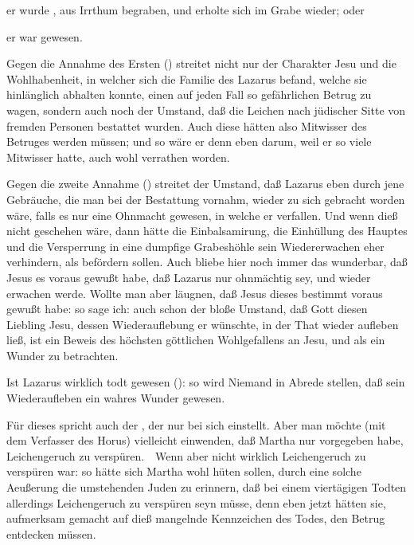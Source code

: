 \begin{aufza}
\begin{aufzb}
\begin{aufzc}
\item er wurde , aus Irrthum begraben, und erholte sich im Grabe wieder; oder
\item er war  gewesen.
\item[Gegen] die Annahme des Ersten () streitet nicht nur der Charakter Jesu und die Wohlhabenheit, in welcher sich die Familie des Lazarus befand, welche sie hinlänglich abhalten konnte, einen auf jeden Fall so gefährlichen Betrug zu wagen, sondern auch noch der Umstand, daß die Leichen nach jüdischer Sitte von fremden Personen bestattet wurden. Auch diese hätten also Mitwisser des Betruges werden müssen; und so wäre er denn eben darum, weil er so viele Mitwisser hatte, auch wohl verrathen worden.
\item[Gegen] die zweite Annahme () streitet der Umstand, daß Lazarus eben durch jene Gebräuche, die man bei der Bestattung vornahm, wieder zu sich gebracht worden wäre, falls es nur eine Ohnmacht gewesen, in welche er verfallen. Und wenn dieß nicht geschehen wäre, dann hätte die Einbalsamirung, die Einhüllung des Hauptes und die Versperrung in eine dumpfige Grabeshöhle sein Wiedererwachen eher verhindern, als befördern sollen. Auch bliebe hier noch immer das wunderbar, daß Jesus es voraus gewußt habe, daß Lazarus nur ohnmächtig sey, und wieder erwachen werde. Wollte man aber läugnen, daß Jesus dieses bestimmt voraus gewußt habe: so sage ich: auch schon der bloße Umstand, daß Gott diesen Liebling Jesu, dessen Wiederauflebung er wünschte, in der That wieder aufleben ließ, ist ein Beweis des höchsten göttlichen Wohlgefallens an Jesu, und als ein Wunder zu betrachten.
\item[Ist Lazarus] wirklich todt gewesen (): so wird Niemand in Abrede stellen, daß sein Wiederaufleben ein wahres Wunder gewesen.
\end{aufzc}
\item Für dieses spricht auch der , der nur bei  sich einstellt. Aber man möchte (mit dem Verfasser des Horus) vielleicht einwenden, daß Martha nur vorgegeben habe, Leichengeruch zu verspüren.~\ Wenn aber nicht wirklich Leichengeruch zu verspüren war: so hätte sich Martha wohl hüten sollen, durch eine solche Aeußerung die umstehenden Juden zu erinnern, daß bei einem viertägigen Todten allerdings Leichengeruch zu verspüren seyn müsse, denn eben jetzt hätten sie, aufmerksam gemacht auf dieß mangelnde Kennzeichen des Todes, den Betrug entdecken müssen.
\end{aufzb}
\end{aufza}


